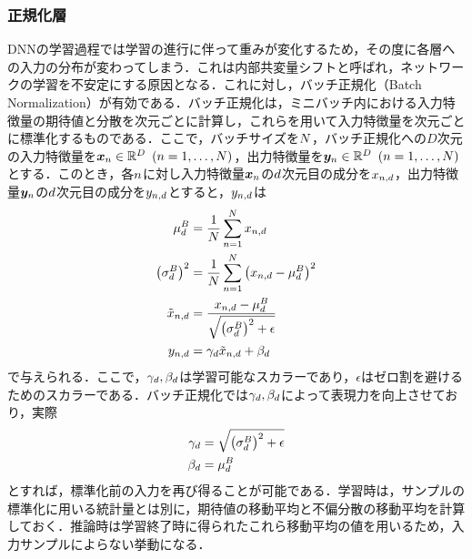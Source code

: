 \subsubsection{正規化層}
DNNの学習過程では学習の進行に伴って重みが変化するため，その度に各層への入力の分布が変わってしまう．これは内部共変量シフトと呼ばれ，ネットワークの学習を不安定にする原因となる．これに対し，バッチ正規化（Batch Normalization）\cite{ioffe2015batch}が有効である．バッチ正規化は，ミニバッチ内における入力特徴量の期待値と分散を次元ごとに計算し，これらを用いて入力特徴量を次元ごとに標準化するものである．ここで，バッチサイズを$N$，バッチ正規化への$D$次元の入力特徴量を$\bm{x}_{n} \in \mathbb{R}^{D} ~ \left(n = 1, \ldots, N\right)$，出力特徴量を$\bm{y}_{n} \in \mathbb{R}^{D} ~ \left(n = 1, \ldots, N\right)$とする．このとき，各$n$に対し入力特徴量$\bm{x}_{n}$の$d$次元目の成分を$x_{n, d}$，出力特徴量$\bm{y}_{n}$の$d$次元目の成分を$y_{n, d}$とすると，$y_{n, d}$は
\begin{align}
    \mu^{B}_{d}                      & = \frac{1}{N} \sum_{n = 1}^{N} x_{n, d}                                  \\
    \left(\sigma^{B}_{d}\right)^{2}              & = \frac{1}{N} \sum_{n = 1}^{N} \left(x_{n, d} - \mu^{B}_{d}\right)^{2} \\
    \tilde{x}_{n, d} & = \frac{x_{n, d} - \mu^{B}_{d}}{\sqrt{\left(\sigma^{B}_{d}\right)^{2} + \epsilon}}       \\
    y_{n, d}        & = \gamma_{d} \tilde{x}_{n, d} +  \beta_{d}
\end{align}
で与えられる．ここで，$\gamma_{d}, \beta_{d}$は学習可能なスカラーであり，$\epsilon$はゼロ割を避けるためのスカラーである．バッチ正規化では$\gamma_{d}, \beta_{d}$によって表現力を向上させており，実際
\begin{align}
    \gamma_{d} & = \sqrt{\left(\sigma^{B}_{d}\right)^{2} + \epsilon} \\
    \beta_{d}      & = \mu^{B}_{d}
\end{align}
とすれば，標準化前の入力を再び得ることが可能である．学習時は，サンプルの標準化に用いる統計量とは別に，期待値の移動平均と不偏分散の移動平均を計算しておく．推論時は学習終了時に得られたこれら移動平均の値を用いるため，入力サンプルによらない挙動になる．

